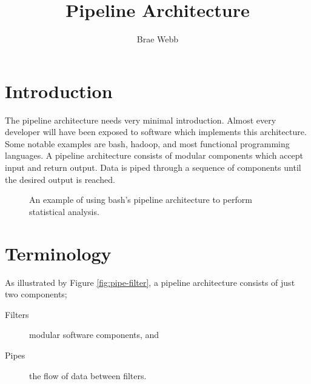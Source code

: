 \title{Pipeline Architecture}
\author{Brae Webb}
\date{}

\maketitle

\section{Introduction}

The pipeline architecture needs very minimal introduction.
Almost every developer will have been exposed to software which implements this architecture.
Some notable examples are bash, hadoop, and most functional programming languages.
A pipeline architecture consists of modular components which accept input and return output.
Data is piped through a sequence of components until the desired output is reached.

\begin{figure}[ht]
    \centering
{}
\caption{An example of using bash's pipeline architecture to perform statistical analysis.}
\label{fig:bash-example}
\end{figure}

\section{Terminology}

As illustrated by Figure \ref{fig:pipe-filter}, a pipeline architecture consists of just two components;

\begin{description}
    \item[Filters] modular software components, and
    \item[Pipes] the flow of data between filters.   
\end{description}

